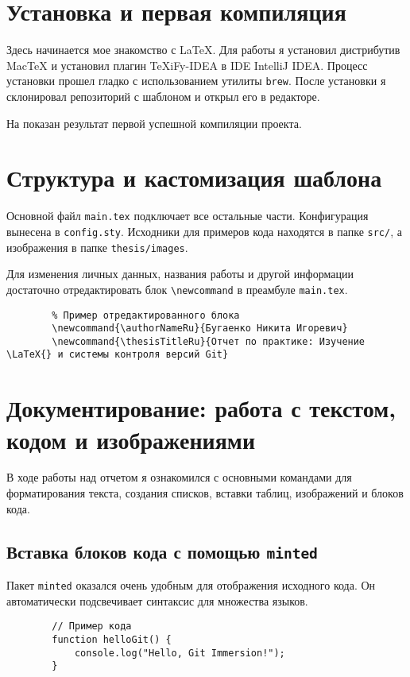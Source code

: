 \section{Установка и первая компиляция}\label{sec:install-and-first-compile}
Здесь начинается мое знакомство с \LaTeX{}.
Для работы я установил дистрибутив MacTeX и установил плагин TeXiFy-IDEA в IDE IntelliJ IDEA\@.
Процесс установки прошел гладко с использованием утилиты \texttt{brew}.
После установки я склонировал репозиторий с шаблоном и открыл его в редакторе.

На  показан результат первой успешной компиляции проекта.

\label{fig:first_compile}


\section{Структура и кастомизация шаблона}\label{sec:structure-and-customization}
Основной файл \texttt{main.tex} подключает все остальные части.
Конфигурация вынесена в \texttt{config.sty}.
Исходники для примеров кода находятся в папке \texttt{src/}, а изображения в папке \texttt{thesis/images}.

Для изменения личных данных, названия работы и другой информации достаточно отредактировать блок \texttt{\textbackslash newcommand} в преамбуле \texttt{main.tex}.
\begin{verbatim}
        % Пример отредактированного блока
        \newcommand{\authorNameRu}{Бугаенко Никита Игоревич}
        \newcommand{\thesisTitleRu}{Отчет по практике: Изучение \LaTeX{} и системы контроля версий Git}
\end{verbatim}


\section{Документирование: работа с текстом, кодом и изображениями}\label{sec:documenting-with-text-code-images}
В ходе работы над отчетом я ознакомился с основными командами для форматирования текста, создания списков, вставки таблиц, изображений и блоков кода.

\subsection{Вставка блоков кода с помощью \texttt{minted}}\label{subsec:minted-code-blocks}
Пакет \texttt{minted} оказался очень удобным для отображения исходного кода.
Он автоматически подсвечивает синтаксис для множества языков.
\begin{verbatim}
        // Пример кода
        function helloGit() {
            console.log("Hello, Git Immersion!");
        }
\end{verbatim}

